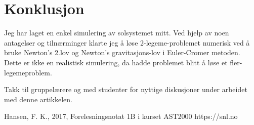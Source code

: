 \documentclass[12pt,preprint]{aastex6}
\begin{document}
\section{Konklusjon}
Jeg har laget en enkel simulering av solsystemet mitt. Ved hjelp av noen antagelser og tilnærminger klarte jeg å løse 2-legeme-problemet numerisk ved å bruke Newton's 2.lov og Newton's gravitasjons-lov i Euler-Cromer metoden. Dette er ikke en realistisk simulering, da hadde problemet blitt å løse et fler-legemeproblem. 





\begin{acknowledgments}
Takk til gruppelærere og med studenter for nyttige diskusjoner under arbeidet med denne artikkelen. 
\end{acknowledgments}




\begin{thebibliography}{}
 Hansen, F. K.,  2017, Forelesningsnotat 1B i kurset AST2000
https://snl.no

\end{thebibliography}
\end{document}
